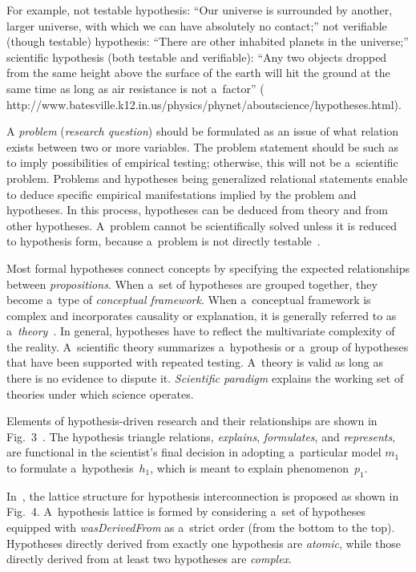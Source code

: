 \begin{multicols}{2}
  For example, not testable hypothesis: ``Our universe is surrounded by another,
larger universe, with which we can have absolutely no contact;'' not verifiable
(though testable) hypothesis: ``There are other inhabited planets in the universe;''
scientific hypothesis (both testable and verifiable):  ``Any two objects dropped from
the same height above the surface of the earth will hit the ground at the same time as
long as air resistance is not a~factor'' ({\sf
http://www.batesville.k12.in.us/physics/phynet/\linebreak aboutscience/hypotheses.html}).

  A \textit{problem} (\textit{research question}) should be formulated as an issue of
what relation exists between two or more variables. The problem statement should be
such as to imply possibilities of empirical testing; otherwise, this will not be a~scientific problem.
Problems and hypotheses being generalized relational statements
enable to deduce specific empirical manifestations implied by the problem and
hypotheses. In this process, hypotheses can be deduced from theory and from other
hypotheses. A~problem cannot be scientifically solved unless it is reduced to
hypothesis form, because a~problem is not directly testable~\cite{9-kl}.

  Most formal hypotheses connect concepts by specifying the expected relationships
between \textit{propositions}. When a~set of hypotheses are grouped together, they
become a~type of \textit{conceptual framework}. When a~conceptual framework is
complex and incorporates causality or explanation, it is generally referred to as a~\textit{theory}~\cite{10-kl}.  In general, hypotheses have to reflect the multivariate
complexity of the reality. A~scientific theory summarizes a~hypothesis or a~group of
hypotheses that have been supported with repeated testing. A~theory is valid as long
as there is no evidence to dispute it. \textit{Scientific paradigm} explains the working
set of theories under which science operates.

  Elements of hypothesis-driven research and their relationships are shown in
Fig.~3~\cite{12-kl, 11-kl}. The hypothesis triangle relations, \textit{explains},
\textit{formulates}, and \textit{represents}, are functional in the scientist's final decision in
adopting a~particular model $m_1$ to formulate a~hypothesis~$h_1$, which
is meant to explain phenomenon~$p_1$.

  In~\cite{11-kl}, the lattice structure for hypothesis interconnection is proposed as
shown in Fig.~4. A~hypothesis lattice is formed by considering a~set of hypotheses
equipped with \textit{wasDerivedFrom} as a~strict order (from the bottom to
the top). Hypotheses directly derived from exactly one hypothesis are \textit{atomic},
while those directly derived from at least two hypotheses are \textit{complex}.




\end{multicols}
